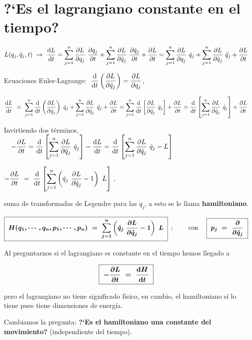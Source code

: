 \vspace{5mm}
\section{?`Es el lagrangiano constante en el tiempo?}


$L(q_j, \dot q_j, t) \ \to \ \displaystyle \dv{L}{t}=\sum_{j=1}^n  \pdv{L}{q_j} \ \pdv{q_j}{t} + \sum_{j=1}^n  \pdv{L}{\dot q_j} \ \pdv{\dot q_j}{t} + \pdv{L}{t} = \sum_{j=1}^n  \pdv{L}{q_j} \ \dot q_j + \sum_{j=1}^n  \pdv{L}{\dot q_j} \ \ddot q_j + \pdv{L}{t}$

Ecuaciones Euler-Lagrange: $\ \displaystyle \dv{t} \left( \pdv{L}{\dot q_j} \right) = \pdv{L}{q_j}$,

$\displaystyle \dv{L}{t} \ = \ \sum_{j=1}^n  \dv{t} \left( \pdv{L}{\dot q_j} \right) \ \dot q_j + \sum_{j=1}^n  \pdv{L}{\dot q_j} \ \ddot q_j + \pdv{L}{t} = \sum_{j=1}^n \dv{t} \left[ \pdv{L}{\dot q_j} \ \dot q_j \right] + \pdv{L}{t} =  \dv{t} \left[ \sum_{j=1}^n  \pdv{L}{\dot q_j} \ \dot q_j \right] + \pdv{L}{t}$

Invirtiendo dos términos, $\quad \displaystyle - \pdv{L}{t} =
 \dv{t} \left[  \sum_{j=1}^n \pdv{L}{\dot q_j} \ \dot q_j \right] - \dv{L}{t}=
 \dv{t} \left[  \sum_{j=1}^n \pdv{L}{\dot q_j} \ \dot q_j  - L\right] $
  
$\displaystyle - \pdv{L}{t} \ = \ 
 \dv{t} \left[  \sum_{j=1}^n  \left( \dot q_j \ \pdv{L}{\dot q_j} - 1 \right) \ L \right] \, , \ $ 
 
 suma de transformadas de Legendre para las $\dot q_j$, a esto se le llama \textbf{hamiltoniano}.


\begin{equation}
\label{T12hamiltoniano}
\boxed{ \ \boldsymbol{
H(q_1, \cdots , q_n, p_1, \cdots, p_n) \ = \ 
 \sum_{j=1}^n  \left( \dot q_j \ \pdv{L}{\dot q_j} - 1 \right) \ L
} \ }	\ \, ; 
\qquad 
\text{ con } \quad 
\boxed{ \ \boldsymbol{
p_j \ = \ \pdv{\dot q_j}
} \ }
\end{equation}

Al preguntarnos si el lagrangiano es constante en el tiempo hemos llegado a

\begin{equation}
\label{T9Hdet}
\boxed{ \ \boldsymbol{	-\pdv{L}{t} \ = \ \dv{H}{t} } \ }
\end{equation}

pero el lagrangiano no tiene significado físico, en cambio, el hamiltoniano sí lo tiene pues tiene dimensiones de energía.

Cambiamos la pregunta: \textbf{?`Es el hamiltoniano una constante del movimiento?} (independiente del tiempo).

